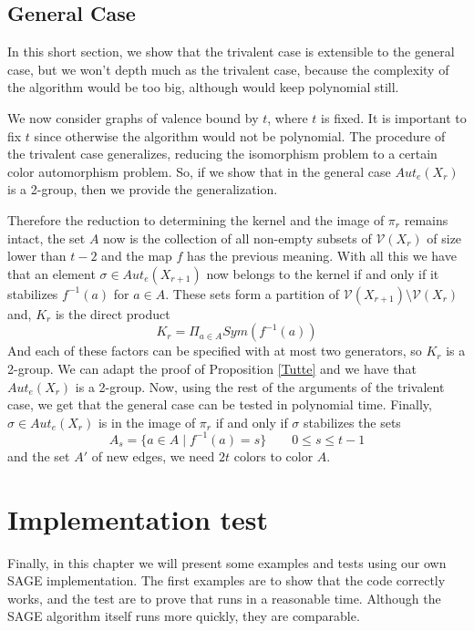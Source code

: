 \documentclass[12pt,a4paper]{book}
\theoremstyle{plain}
\theoremstyle{definition}
\theoremstyle{remark}
\begin{document}
\section{General Case}

In this short section, we show  that the trivalent case is extensible to the general case, but we won't depth much as the trivalent 
case,  because the complexity of the algorithm would be too big, although would  keep 
polynomial still. 

We now consider graphs of valence bound by $t$, where $t$ is fixed. It is important to fix $t$ since otherwise the algorithm 
would not be polynomial. The procedure of the trivalent case generalizes, reducing the isomorphism problem to a certain color 
automorphism problem. So, if we show that in the general case $Aut_e(X_r)$ is a 2-group,  then we  provide  the generalization. 

Therefore the reduction to determining the kernel and the image of $\pi_r$ remains intact, the set $A$ now is the collection 
of all non-empty subsets of $\mathcal{V}(X_r)$ of size lower than $t-2$ and the map $f$ has the previous meaning. With all this 
we have that an element $\sigma \in Aut_e (X_{r+1})$ now belongs to the kernel if and only if it stabilizes $f^{-1}(a) $ for 
$a \in A$. These sets form a partition of $\mathcal{V}(X_{r+1}) \setminus \mathcal{V}(X_r)$ and,  $K_r$ is the direct product 
\[
 K_r = \Pi_{a \in A} Sym ( f^{-1}(a))
\]
And each of these factors can be specified with at most two generators, so $K_r$ is a 2-group. We can adapt the proof of 
Proposition \ref{Tutte} and we have that $Aut_e(X_r)$ is a 2-group. Now, using  the rest of the arguments of the trivalent 
case, we get that the general case can be tested in polynomial time. Finally,  $\sigma \in Aut_e(X_r)$ is in the image 
of $\pi_r$ if and only if $\sigma $ stabilizes the sets 
\[
 A_s = \{ a \in A \; | \; f^{-1}(a) = s \} \qquad 0 \leq s \leq t-1
\]
and the set $A'$ of new edges, we need $2t$ colors to color $A$.

\chapter{Implementation test}
 
 Finally,  in this chapter we will present some examples and tests using our own  SAGE implementation. The first examples are to show that the 
 code correctly works, and the test are to prove that  runs in a reasonable time.  Although the SAGE algorithm itself runs more 
 quickly,  they are comparable.
 
\end{document}
